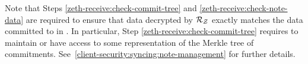 Note that Steps \ref{zeth-receive:check-commit-tree} and \ref{zeth-receive:check-note-data} are required to ensure that data decrypted by $\mathcal{{R}_{Z}}$ exactly matches the data committed to in \mixer{}. In particular, Step \ref{zeth-receive:check-commit-tree} requires  to maintain or have access to some representation of the Merkle tree of commitments. See~\cref{client-security:syncing:note-management} for further details.
